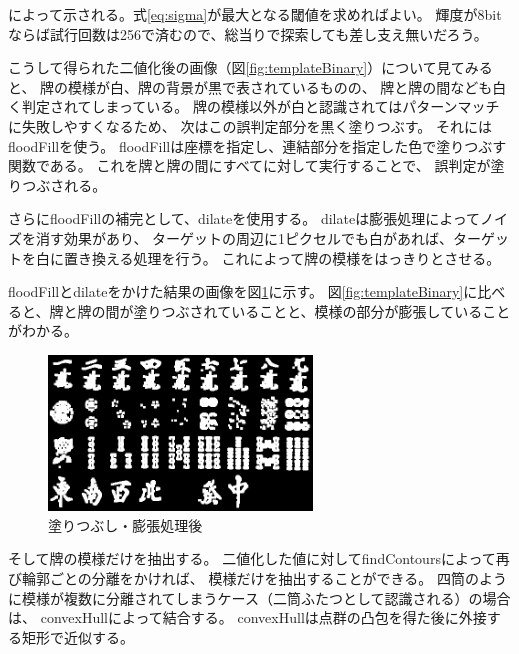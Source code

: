 \documentclass{jsarticle}
\begin{document}
\begin{multicols}{2}
によって示される。式\ref{eq:sigma}が最大となる閾値を求めればよい。
輝度が8bitならば試行回数は256で済むので、総当りで探索しても差し支え無いだろう。

%

こうして得られた二値化後の画像（図\ref{fig:templateBinary}）について見てみると、
牌の模様が白、牌の背景が黒で表されているものの、
牌と牌の間なども白く判定されてしまっている。
牌の模様以外が白と認識されてはパターンマッチに失敗しやすくなるため、
次はこの誤判定部分を黒く塗りつぶす。
それにはfloodFillを使う。
floodFillは座標を指定し、連結部分を指定した色で塗りつぶす関数である。
これを牌と牌の間にすべてに対して実行することで、
誤判定が塗りつぶされる。

さらにfloodFillの補完として、dilateを使用する。
dilateは膨張処理によってノイズを消す効果があり、
ターゲットの周辺に1ピクセルでも白があれば、ターゲットを白に置き換える処理を行う。
これによって牌の模様をはっきりとさせる。

floodFillとdilateをかけた結果の画像を図\ref{fig:templateFill}に示す。
図\ref{fig:templateBinary}に比べると、牌と牌の間が塗りつぶされていることと、模様の部分が膨張していることがわかる。

\begin{figure}[H]
  \begin{center}
    \includegraphics[clip,width=7.0cm]{./img/template_fill.png}
    \caption{塗りつぶし・膨張処理後}
    \label{fig:templateFill}
  \end{center}
\end{figure}

そして牌の模様だけを抽出する。
二値化した値に対してfindContoursによって再び輪郭ごとの分離をかければ、
模様だけを抽出することができる。
四筒のように模様が複数に分離されてしまうケース（二筒ふたつとして認識される）の場合は、
convexHullによって結合する。
convexHullは点群の凸包を得た後に外接する矩形で近似する。


\end{multicols}
\end{document}
